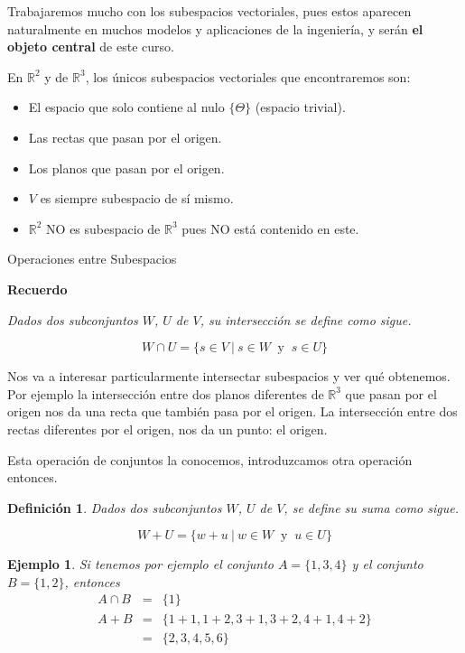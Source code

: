 \documentclass[12pt]{book}
\newtheorem{defi}{Definici\'on}
\newtheorem{ejem}{Ejemplo}
\def\R{\mathbb{R}}
\begin{document}
Trabajaremos mucho con los subespacios vectoriales, pues estos aparecen naturalmente en muchos modelos y aplicaciones de la ingeniería, y serán {\bf el objeto central} de este curso.

En $\R^2$ y de $\R^3$, los únicos subespacios vectoriales que encontraremos son: 

\begin{multicols}{2}
\begin{itemize}
\item El espacio que solo contiene al nulo $\{\Theta\}$ (espacio trivial).
\item Las rectas que pasan por el origen.
\item Los planos que pasan por el origen.
\item $V$ es siempre subespacio de sí mismo.
\item $\R^2$ NO es subespacio de $\R^3$ pues NO está contenido en este.
\end{itemize}
\end{multicols}

\newpage

\begin{center}
{\Large Operaciones entre Subespacios}
\end{center}

\vspace{.3cm}

{\bf Recuerdo}\\{\em
Dados dos subconjuntos $W$, $U$ de $V$, su \emph{intersección} se define como sigue.

\[ W\cap U=\{s\in V\ |\ s\in W\ \textrm{ y }\ s\in U\}\]
}

Nos va a interesar particularmente intersectar subespacios y ver qué obtenemos.
Por ejemplo la intersección entre dos planos diferentes de $\R^3$ que pasan por el origen nos da una recta que también pasa por el origen.
La intersección entre dos rectas diferentes por el origen, nos da un punto: el origen.

Esta operación de conjuntos la conocemos, introduzcamos otra operación entonces.


\begin{defi}
Dados dos subconjuntos $W$, $U$ de $V$, se define su \emph{suma} como sigue.

\[ W+U=\{w+u\ |\ w\in W\ \textrm{ y }\ u\in U\}\]
\end{defi}

\begin{ejem}{\em 
Si tenemos por ejemplo el conjunto $A=\{1,3,4\}$ y el conjunto $B=\{1,2\}$, entonces 
\begin{eqnarray*}
A\cap B&=&\{1\}\\
A+B&=& \{1+1,1+2,3+1,3+2,4+1,4+2\}\\
&=&\{2,3,4,5,6\}
\end{eqnarray*}
}
\end{ejem}
\end{document}
